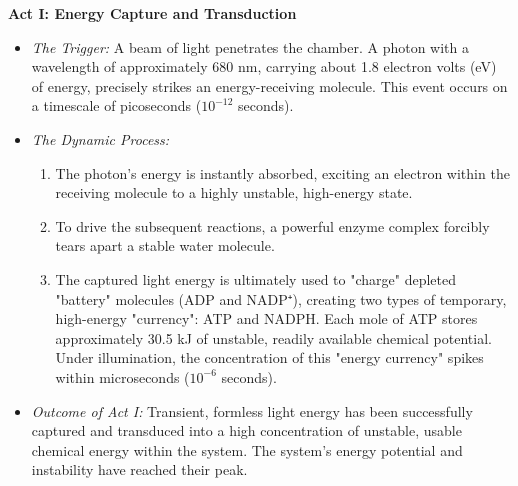 \documentclass[11pt, a4paper]{article}
\begin{document}
\textbf{Act I: Energy Capture and Transduction}
\begin{itemize}
    \item \textit{The Trigger:} A beam of light penetrates the chamber. A photon with a wavelength of approximately 680 nm, carrying about 1.8 electron volts (eV) of energy, precisely strikes an energy-receiving molecule. This event occurs on a timescale of picoseconds ($10^{-12}$ seconds).
    \item \textit{The Dynamic Process:}
    \begin{enumerate}
        \item The photon's energy is instantly absorbed, exciting an electron within the receiving molecule to a highly unstable, high-energy state.
        \item To drive the subsequent reactions, a powerful enzyme complex forcibly tears apart a stable water molecule.
        \item The captured light energy is ultimately used to "charge" depleted "battery" molecules (ADP and NADP⁺), creating two types of temporary, high-energy "currency": ATP and NADPH. Each mole of ATP stores approximately 30.5 kJ of unstable, readily available chemical potential. Under illumination, the concentration of this "energy currency" spikes within microseconds ($10^{-6}$ seconds).
    \end{enumerate}
    \item \textit{Outcome of Act I:} Transient, formless light energy has been successfully captured and transduced into a high concentration of unstable, usable chemical energy within the system. The system's energy potential and instability have reached their peak.
\end{itemize}
\end{document}
